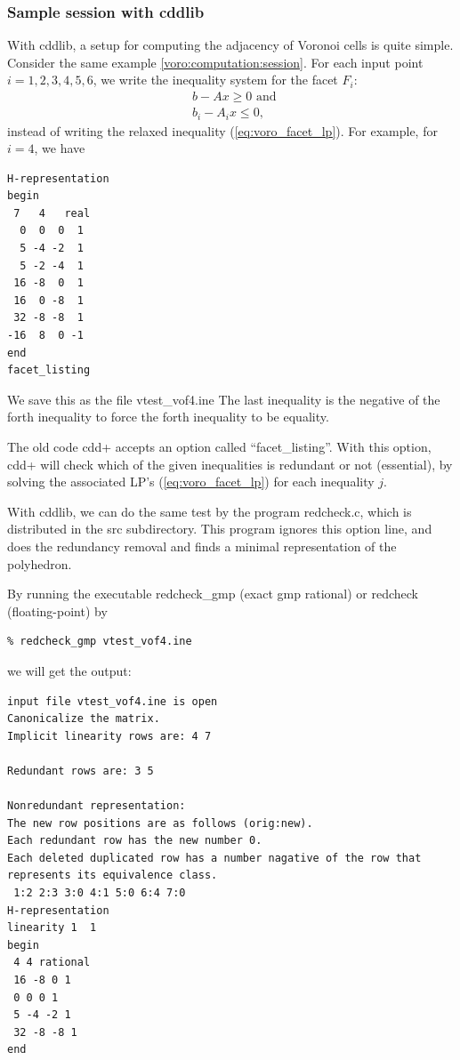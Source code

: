 \documentclass[[a4paper,12pt]{article}
\newcommand{\HBrule}{\noindent \hrulefill \medskip}
\newcommand{\HTrule}{\medskip \noindent \hrulefill}
\begin{document}
\subsubsection{Sample session with cddlib}
\label{voro:adjacency:session}
\begin{small}
With cddlib, a setup for computing the adjacency of Voronoi cells is
quite simple.  Consider the same example
\ref{voro:computation:session}.  For each input point
$i=1,2,3,4,5,6$, we write the inequality system for the facet $F_i$:
\[
\begin{array}{ll}
& b -  A  x \ge 0 \text{ and }\\
& b_i -  A_i x \le 0 \text{,}
\end{array}
\]
instead of writing the relaxed inequality (\ref{eq:voro_facet_lp}).  
For example, for $i=4$, we have

\HTrule
\begin{verbatim}
H-representation
begin
 7   4   real
  0  0  0  1
  5 -4 -2  1
  5 -2 -4  1
 16 -8  0  1
 16  0 -8  1
 32 -8 -8  1
-16  8  0 -1
end
facet_listing
\end{verbatim}
\HBrule

\noindent
We save this as the file vtest\_vof4.ine
The last inequality is the negative of the forth inequality
to force the forth inequality to be equality.

The old code cdd+ accepts an option called ``facet\_listing''.  With
this option, cdd+ will check which of
the given inequalities is redundant or not (essential), by solving
the associated LP's  (\ref{eq:voro_facet_lp}) 
for each inequality $j$.

With cddlib,  we can do the same test by 
the program redcheck.c, which is distributed in
the src subdirectory.   This program ignores this option line, and
does the redundancy removal and finds a minimal representation of the polyhedron.

By running the executable  redcheck\_gmp (exact gmp rational) or redcheck (floating-point) by 

\begin{verbatim}
% redcheck_gmp vtest_vof4.ine
\end{verbatim}
we will get the output:

\HTrule
\begin{verbatim}
input file vtest_vof4.ine is open
Canonicalize the matrix.
Implicit linearity rows are: 4 7 

Redundant rows are: 3 5 

Nonredundant representation:
The new row positions are as follows (orig:new).
Each redundant row has the new number 0.
Each deleted duplicated row has a number nagative of the row that
represents its equivalence class.
 1:2 2:3 3:0 4:1 5:0 6:4 7:0
H-representation
linearity 1  1
begin
 4 4 rational
 16 -8 0 1
 0 0 0 1
 5 -4 -2 1
 32 -8 -8 1
end
\end{verbatim}
\HBrule


\end{small}
\end{document}
